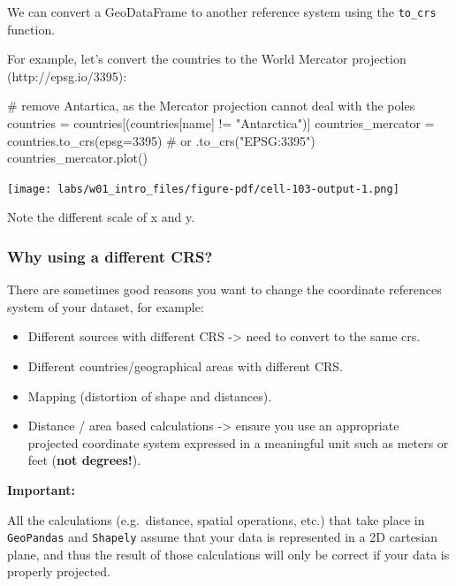 \documentclass[
  letterpaper,
  DIV=11,
  numbers=noendperiod]{scrreprt}
\newenvironment{Shaded}{\begin{snugshade}}{\end{snugshade}}
\newcommand{\CommentTok}[1]{\textcolor[rgb]{0.37,0.37,0.37}{#1}}
\newcommand{\DecValTok}[1]{\textcolor[rgb]{0.68,0.00,0.00}{#1}}
\newcommand{\NormalTok}[1]{\textcolor[rgb]{0.00,0.23,0.31}{#1}}
\newcommand{\OperatorTok}[1]{\textcolor[rgb]{0.37,0.37,0.37}{#1}}
\newcommand{\StringTok}[1]{\textcolor[rgb]{0.13,0.47,0.30}{#1}}
\providecommand{\tightlist}{%
  \setlength{\itemsep}{0pt}\setlength{\parskip}{0pt}}\usepackage{longtable,booktabs,array}
\begin{document}
We can convert a GeoDataFrame to another reference system using the
\texttt{to\_crs} function.

For example, let's convert the countries to the World Mercator
projection (http://epsg.io/3395):

\begin{Shaded}
\begin{Highlighting}[]
\CommentTok{\# remove Antartica, as the Mercator projection cannot deal with the poles}
\NormalTok{countries }\OperatorTok{=}\NormalTok{ countries[(countries[}\StringTok{\textquotesingle{}name\textquotesingle{}}\NormalTok{] }\OperatorTok{!=} \StringTok{"Antarctica"}\NormalTok{)]}
\NormalTok{countries\_mercator }\OperatorTok{=}\NormalTok{ countries.to\_crs(epsg}\OperatorTok{=}\DecValTok{3395}\NormalTok{)  }\CommentTok{\# or .to\_crs("EPSG:3395")}
\NormalTok{countries\_mercator.plot()}
\end{Highlighting}
\end{Shaded}

\texttt{[image: labs/w01\_intro\_files/figure-pdf/cell-103-output-1.png]}

Note the different scale of x and y.

\subsubsection{Why using a different
CRS?}\label{why-using-a-different-crs}

There are sometimes good reasons you want to change the coordinate
references system of your dataset, for example:

\begin{itemize}
\tightlist
\item
  Different sources with different CRS -\textgreater{} need to convert
  to the same crs.\\
\item
  Different countries/geographical areas with different CRS.
\item
  Mapping (distortion of shape and distances).
\item
  Distance / area based calculations -\textgreater{} ensure you use an
  appropriate projected coordinate system expressed in a meaningful unit
  such as meters or feet (\textbf{not degrees!}).
\end{itemize}

\textbf{Important:}

All the calculations (e.g.~distance, spatial operations, etc.) that take
place in \texttt{GeoPandas} and \texttt{Shapely} assume that your data
is represented in a 2D cartesian plane, and thus the result of those
calculations will only be correct if your data is properly projected.
\end{document}
